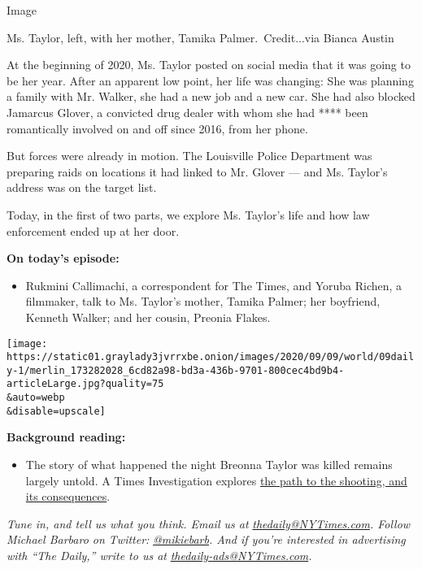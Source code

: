 Image

Ms. Taylor, left, with her mother, Tamika Palmer.~Credit...via Bianca
Austin

At the beginning of 2020, Ms. Taylor posted on social media that it was
going to be her year. After an apparent low point, her life was
changing: She was planning a family with Mr. Walker, she had a new job
and a new car. She had also blocked Jamarcus Glover, a convicted drug
dealer with whom she had **** been romantically involved on and off
since 2016, from her phone.

But forces were already in motion. The Louisville Police Department was
preparing raids on locations it had linked to Mr. Glover --- and Ms.
Taylor's address was on the target list.

Today, in the first of two parts, we explore Ms. Taylor's life and how
law enforcement ended up at her door.

\textbf{On today's episode:}

\begin{itemize}
\tightlist
\item
  Rukmini Callimachi, a correspondent for The Times, and Yoruba Richen,
  a filmmaker, talk to Ms. Taylor's mother, Tamika Palmer; her
  boyfriend, Kenneth Walker; and her cousin, Preonia Flakes.
\end{itemize}

\texttt{[image: https://static01.graylady3jvrrxbe.onion/images/2020/09/09/world/09daily-1/merlin\_173282028\_6cd82a98-bd3a-436b-9701-800cec4bd9b4-articleLarge.jpg?quality=75\\\&auto=webp\\\&disable=upscale]}

\textbf{Background reading:}

\begin{itemize}
\tightlist
\item
  The story of what happened the night Breonna Taylor was killed remains
  largely untold. A Times Investigation explores
  \href{https://www.nytimes3xbfgragh.onion/2020/08/30/us/breonna-taylor-police-killing.html}{the
  path to the shooting, and its consequences}.
\end{itemize}

\emph{Tune in, and tell us what you think. Email us at}
\href{mailto:thedaily@NYTimes.com}{\emph{thedaily@NYTimes.com}}\emph{.
Follow Michael Barbaro on Twitter:}
\href{https://twitter.com/mikiebarb}{\emph{@mikiebarb}}\emph{. And if
you're interested in advertising with ``The Daily,'' write to us at}
\href{mailto:thedaily-ads@NYTimes.com}{\emph{thedaily-ads@NYTimes.com}}\emph{.}

